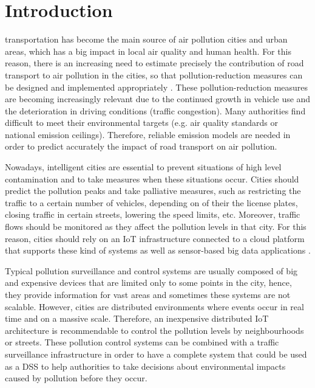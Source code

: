 
\chapter{Introduction}
 transportation has become the main source of air pollution cities and urban areas, which has a big impact in local air quality and human health. For this reason, there is an increasing need to estimate precisely the contribution of road transport to air pollution in the cities, so that pollution-reduction measures can be designed and implemented appropriately \cite{SNB10}. These pollution-reduction measures are becoming increasingly relevant due to the continued growth in vehicle use and the deterioration in driving conditions (traffic congestion). Many authorities find difficult to meet their environmental targets (e.g. air quality standards or national emission ceilings). Therefore, reliable emission models are needed in order to predict accurately the impact of road transport on air pollution.

Nowadays, intelligent cities are essential to prevent situations of high level contamination and to take measures when these situations occur. Cities should predict the pollution peaks and take palliative measures, such as restricting the traffic to a certain number of vehicles, depending on of their the license plates, closing traffic in certain streets, lowering the speed limits, etc. Moreover, traffic flows should be monitored as they affect the pollution levels in that city. For this reason, cities should rely on an \ac{IoT} infrastructure connected to a cloud platform that supports these kind of systems as well as sensor-based big data applications \cite{Bib18}.

Typical pollution surveillance and control systems are usually composed of big and expensive devices that are limited only to some points in the city, hence, they provide information for vast areas and sometimes these systems are not scalable. However, cities are distributed environments where events occur in real time and on a massive scale. Therefore, an inexpensive distributed \ac{IoT} architecture is recommendable to control the pollution levels by neighbourhoods or streets. These pollution control systems can be combined with a traffic surveillance infrastructure in order to have a complete system that could be used as a \ac{DSS} to help authorities to take decisions about environmental impacts caused by pollution before they occur.

